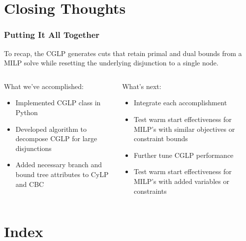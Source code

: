 \documentclass{beamer}
\begin{document}
	\section{Closing Thoughts}
	
	\begin{frame}[t]
		\frametitle{Putting It All Together}
		\small
		\begin{block}{}
			To recap, the CGLP generates cuts that retain primal and dual bounds from a MILP solve while resetting the underlying disjunction to a single node.
		\end{block}
		\begin{columns}[T]
			\begin{column}{0.5\textwidth}
				What we've accomplished:
				\begin{itemize}
					\item Implemented CGLP class in Python
					\item Developed algorithm to decompose CGLP for large disjunctions
					\item Added necessary branch and bound tree attributes to CyLP and CBC
				\end{itemize}
			\end{column}
			\begin{column}{0.45\textwidth}
				What's next:
				\begin{itemize}
					\item Integrate each accomplishment
					\item Test warm start effectiveness for MILP's with similar objectives or constraint bounds
					\item Further tune CGLP performance
					\item Test warm start effectiveness for MILP's with added variables or constraints
				\end{itemize}
			\end{column}
		\end{columns}
		\normalsize
	\end{frame}

	\section{Index}
	
\end{document}

